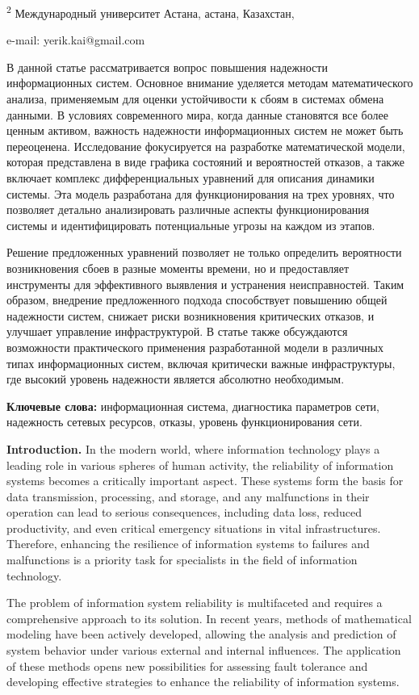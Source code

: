 \textsuperscript{2} Международный университет Астана, астана, Казахстан,

e-mail: yerik.kai@gmail.com

В данной статье рассматривается вопрос повышения надежности
информационных систем. Основное внимание уделяется методам
математического анализа, применяемым для оценки устойчивости к сбоям в
системах обмена данными. В условиях современного мира, когда данные
становятся все более ценным активом, важность надежности информационных
систем не может быть переоценена. Исследование фокусируется на
разработке математической модели, которая представлена в виде графика
состояний и вероятностей отказов, а также включает комплекс
дифференциальных уравнений для описания динамики системы. Эта модель
разработана для функционирования на трех уровнях, что позволяет детально
анализировать различные аспекты функционирования системы и
идентифицировать потенциальные угрозы на каждом из этапов.

Решение предложенных уравнений позволяет не только определить
вероятности возникновения сбоев в разные моменты времени, но и
предоставляет инструменты для эффективного выявления и устранения
неисправностей. Таким образом, внедрение предложенного подхода
способствует повышению общей надежности систем, снижает риски
возникновения критических отказов, и улучшает управление
инфраструктурой. В статье также обсуждаются возможности практического
применения разработанной модели в различных типах информационных систем,
включая критически важные инфраструктуры, где высокий уровень надежности
является абсолютно необходимым.

\textbf{Ключевые слова:} информационная система, диагностика параметров
сети, надежность сетевых ресурсов, отказы, уровень функционирования
сети.

\textbf{Introduction.} In the modern world, where information technology
plays a leading role in various spheres of human activity, the
reliability of information systems becomes a critically important
aspect. These systems form the basis for data transmission, processing,
and storage, and any malfunctions in their operation can lead to serious
consequences, including data loss, reduced productivity, and even
critical emergency situations in vital infrastructures. Therefore,
enhancing the resilience of information systems to failures and
malfunctions is a priority task for specialists in the field of
information technology.

The problem of information system reliability is multifaceted and
requires a comprehensive approach to its solution. In recent years,
methods of mathematical modeling have been actively developed, allowing
the analysis and prediction of system behavior under various external
and internal influences. The application of these methods opens new
possibilities for assessing fault tolerance and developing effective
strategies to enhance the reliability of information systems.

